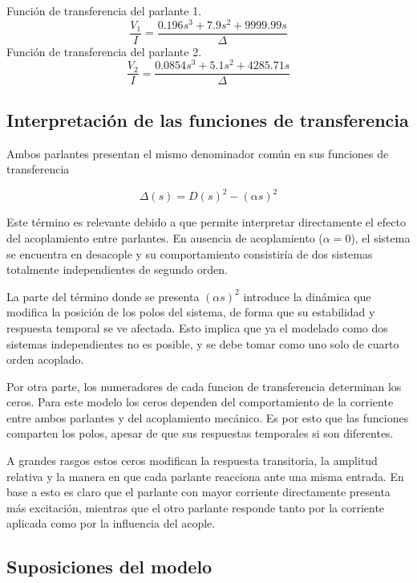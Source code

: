 \documentclass[journal]{IEEEtran}
\begin{document}
Función de transferencia del parlante 1.
\begin{equation*}
  \frac{V_1}{I}= \frac{0.196s^3+7.9s^2+9999.99s}{\Delta}
\end{equation*}
Función de transferencia del parlante 2.
\begin{equation*}
  \frac{V_2}{I}= \frac{0.0854s^3+5.1s^2+4285.71s}{\Delta} 
\end{equation*}



\subsection{Interpretación de las funciones de transferencia}

Ambos parlantes presentan el mismo denominador común en sus funciones de transferencia 

\begin{equation}
\Delta(s) = D(s)^2 - (\alpha s)^2
\end{equation}

Este término es relevante debido a que permite interpretar directamente el efecto del acoplamiento entre parlantes. En ausencia de acoplamiento ($\alpha =0$), el sistema se encuentra en desacople y su comportamiento consistiría de dos sistemas totalmente independientes de segundo orden.


La parte del término donde se presenta $(\alpha s)^2$ introduce la dinámica que modifica la posición de los polos del sistema, de forma que su estabilidad y respuesta temporal se ve afectada. Esto implica que ya el modelado como dos sistemas independientes no es posible, y se debe tomar como uno solo de cuarto orden acoplado.

Por otra parte, los numeradores de cada funcion de transferencia determinan los ceros. Para este modelo los ceros dependen del comportamiento de la corriente entre ambos parlantes y del acoplamiento mecánico. Es por esto que las funciones comparten los polos, apesar de que sus respuestas temporales si son diferentes. 

A grandes rasgos estos ceros modifican la respuesta transitoria, la amplitud relativa y la manera en que cada parlante reacciona ante una misma entrada. En base a esto es claro que el parlante con mayor corriente directamente presenta más excitación, mientras que el otro parlante responde tanto por la corriente aplicada como por la influencia del acople.

\subsection{Suposiciones del modelo}
\end{document}
